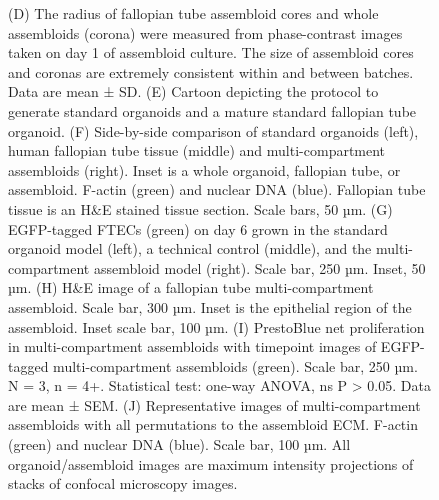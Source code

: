\begin{refsection}
    \begin{figure}[h!]
        \ContinuedFloat
        \captionsetup{font=small}
        \caption[]{(D) The radius of fallopian tube assembloid cores and whole assembloids (corona) were measured from phase-contrast images taken on day 1 of assembloid culture. The size of assembloid cores and coronas are extremely consistent within and between batches. Data are mean ± SD.  (E) Cartoon depicting the protocol to generate standard organoids and a mature standard fallopian tube organoid. (F) Side-by-side comparison of standard organoids (left), human fallopian tube tissue (middle) and multi-compartment assembloids (right). Inset is a whole organoid, fallopian tube, or assembloid. F-actin (green) and nuclear DNA (blue). Fallopian tube tissue is an H\&E stained tissue section. Scale bars, 50 µm. (G) EGFP-tagged FTECs (green) on day 6 grown in the standard organoid model (left), a technical control (middle), and the multi-compartment assembloid model (right). Scale bar, 250 µm. Inset, 50 µm. (H) H\&E image of a fallopian tube multi-compartment assembloid. Scale bar, 300 µm. Inset is the epithelial region of the assembloid. Inset scale bar, 100 µm. (I) PrestoBlue net proliferation in multi-compartment assembloids with timepoint images of EGFP-tagged multi-compartment assembloids (green). Scale bar, 250 µm. N = 3, n = 4+. Statistical test: one-way ANOVA, ns P > 0.05. Data are mean ± SEM. (J) Representative images of multi-compartment assembloids with all permutations to the assembloid ECM. F-actin (green) and nuclear DNA (blue). Scale bar, 100 µm. All organoid/assembloid images are maximum intensity projections of stacks of confocal microscopy images.}
    \end{figure}


\end{refsection}
